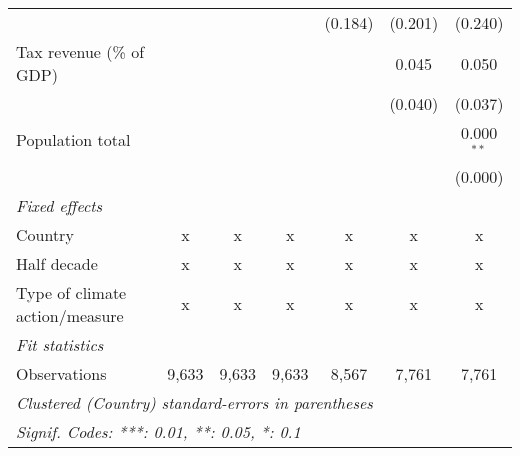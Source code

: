 \begin{tabular}{lcccccc}
                                                 &              &              &               & (0.184)      & (0.201)      & (0.240)\\   
   Tax revenue (\% of GDP)                       &              &              &               &              & 0.045        & 0.050\\   
                                                 &              &              &               &              & (0.040)      & (0.037)\\   
   Population total                              &              &              &               &              &              & 0.000$^{**}$\\   
                                                 &              &              &               &              &              & (0.000)\\   
   \emph{Fixed effects}\\
   Country                                       & x            & x            & x             & x            & x            & x\\  
   Half decade                                   & x            & x            & x             & x            & x            & x\\  
   Type of climate action/measure                & x            & x            & x             & x            & x            & x\\  
   \midrule \emph{Fit statistics}\\
   Observations                                  & 9,633        & 9,633        & 9,633         & 8,567        & 7,761        & 7,761\\  
   \midrule
   \multicolumn{7}{l}{\emph{Clustered (Country) standard-errors in parentheses}}\\
   \multicolumn{7}{l}{\emph{Signif. Codes: ***: 0.01, **: 0.05, *: 0.1}}\\
\end{tabular}
\par\endgroup


